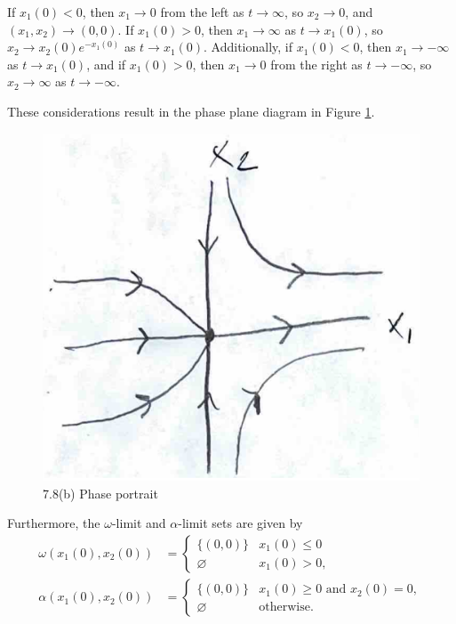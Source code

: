 \documentclass[nonumber]{homework}
\begin{document}
	If $x_1(0) < 0$, then $x_1 \to 0$ from the left as $t \to \infty$, so $x_2 \to 0$, and $(x_1,x_2) \to (0,0)$. If $x_1(0) > 0$, then $x_1 \to \infty$ as $t\to x_1(0)$, so $x_2 \to x_2(0)e^{-x_1(0)}$ as $t\to x_1(0)$. Additionally, if $x_1(0) <0$, then $x_1 \to  -\infty$ as $t \to x_1(0)$, and if $x_1(0) > 0$, then $x_1 \to 0$ from the right as $t\to- \infty$, so $x_2 \to \infty$ as $t \to -\infty$.
	
	These considerations result in the phase plane diagram in Figure \ref{fig:78b}.
	\begin{figure}[h]
		\centering
		\includegraphics[width=.6\textwidth]{p78b.png}
		\caption{7.8(b) Phase portrait}
		\label{fig:78b}
	\end{figure}
	Furthermore, the $\omega$-limit and $\alpha$-limit sets are given by
	\begin{align*}
		\omega(x_1(0),x_2(0)) &= \begin{cases}
			\{(0,0)\} & x_1(0) \le 0 \\
			\varnothing & x_1(0) > 0,
		\end{cases}\\[0.5em]
		\alpha(x_1(0), x_2(0)) &= \begin{cases}
			\{(0,0)\} & x_1(0)\ge 0 \text{ and } x_2(0) = 0, \\
			\varnothing & \text{otherwise}.
		\end{cases}
	\end{align*}
	
	
\end{document}
